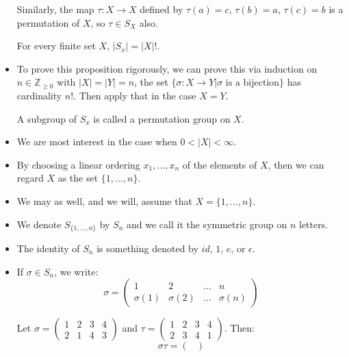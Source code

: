 \begin{itemize}
\begin{example}
        Similarly, the map $\tau: X\to X$ defined by $\tau(a)=c$, $\tau(b)=a$, $\tau(c)=b$ is a permutation of $X$, so $\tau \in S_X$ also.
    \end{example}
    \begin{proposition}
        For every finite set $X$, $|S_x| = |X|!$.
    \end{proposition}
    \item To prove this proposition rigorously, we can prove this via induction on $n\in \mathbb{Z}_{\ge 0}$ with $|X|=|Y|=n$, the set $\{\sigma:X\to Y|\sigma\text{ is a bijection}\}$ has cardinality $n!$. Then apply that in the case $X=Y$.
    \begin{definition}
        A subgroup of $S_x$ is called a permutation group on $X$.
    \end{definition}
    \item We are most interest in the case when $0<|X|<\infty$.
    \item By choosing a linear ordering $x_1,\dots,x_n$ of the elements of $X$, then we can regard $X$ as the set $\{1,\dots,n\}$.
    \item We may as well, and we will, assume that $X=\{1,\dots, n\}$.
    \item We denote $S_{\{1,\dots,n\}}$ by $S_n$ and we call it the symmetric group on $n$ letters.
    \item The identity of $S_n$ is something denoted by $id$, $1$, $e$, or $\epsilon$. 
    \item If $\sigma \in S_n$, we write:
    \begin{equation}
        \sigma = \begin{pmatrix}
            1 & 2 & \dots & n \\ 
            \sigma(1) & \sigma(2) & \dots & \sigma(n)
        \end{pmatrix}
    \end{equation}
    \begin{example}
        Let $\sigma = \begin{pmatrix}
            1&2&3&4 \\ 
            2&1&4&3
        \end{pmatrix}$ and $\tau = \begin{pmatrix}
            1&2&3&4\\ 2& 3& 4&1
        \end{pmatrix}$. Then:
        \begin{equation}
            \sigma\tau = \begin{pmatrix}

\end{pmatrix}
\end{equation}
\end{example}
\end{itemize}
